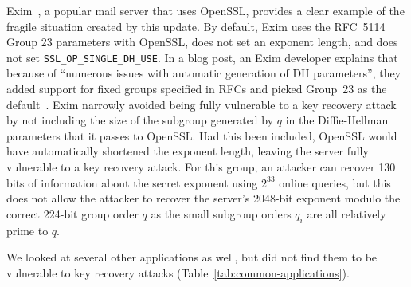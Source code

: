 Exim~\cite{exim}, a popular mail server that uses OpenSSL, provides a clear
example of the fragile situation created by this update. By default, Exim uses
the RFC~5114 Group 23 parameters with OpenSSL, does not set an exponent length,
and does not set \texttt{SSL\_OP\_SINGLE\-\_DH\_USE}. In a blog post, an Exim
developer explains that because of ``numerous issues with automatic generation
of DH parameters'', they added support for fixed groups specified in RFCs and picked
Group~23 as the default~\cite{exim-blog}.  Exim narrowly avoided being fully
vulnerable to a key recovery attack by not including the size of the subgroup
generated by $q$ in the Diffie-Hellman parameters that it passes to OpenSSL.
Had this been included, OpenSSL would have automatically shortened the exponent
length, leaving the server fully vulnerable to a key recovery attack.  For this
group, an attacker can recover 130 bits of information about the secret
exponent using $2^{33}$ online queries, but this does not allow the attacker to
recover the server's 2048-bit exponent modulo the correct 224-bit group order
$q$ as the small subgroup orders $q_i$ are all relatively prime to $q$.

We looked at several other applications as well, but did not find them to be
vulnerable to key recovery attacks (Table~\ref{tab:common-applications}).








